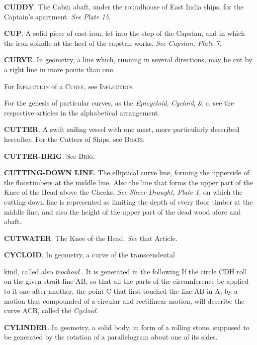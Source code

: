 \textbf{CUDDY}. The Cabin abaft, under the roundhouse of East India ships, for the Captain's apartment. \textit{See Plate 15}. 

\textbf{CUP}. A solid piece of cast-iron, let into the step of the Capstan, and in which the iron spindle at the heel of the capstan works. \textit{See Capstan, Plate 7}. 

\textbf{CURVE}. In geometry, a line which, running in several directions, may be cut by a right line in more points than one. 

For \textsc{Inflection} of a \textsc{Curve}, see \textsc{Inflection}. 

For the genesis of particular curves, as the \textit{Epicycloid}, \textit{Cycloid}, \& c. see the respective articles in the alphabetical arrangement. 

\textbf{CUTTER}. A swift sailing vessel with one mast, more particularly described hereafter. For the Cutters of Ships, see \textsc{Boats}. 

\textbf{CUTTER-BRIG}. See \textsc{Brig}. 

\textbf{CUTTING-DOWN LINE}. The elliptical curve line, forming the upperside of the floortimbers at the middle line. Also the line that forms the upper part of the Knee of the Head above the Cheeks. \textit{See Sheer Draught, Plate 1}, on which the cutting down line is represented as limiting the depth of every floor timber at the middle line, and also the height of the upper part of the dead wood afore and abaft. 

\textbf{CUTWATER}. The Knee of the Head. \textit{See} that Article. 

\textbf{CYCLOID}. In geometry, a curve of the transcendental
\begin{figure}
\begin{center}
\end{center}
\end{figure} 
kind, called also \textit{trochoid} . It is generated in the following If the circle CDH roll on the given strait line AB, so that all the parts of the circumference be applied to it one after another, the point C that first touched the line AB in A, by a motion thus compounded of a circular and rectilinear motion, will describe the curve ACB, called the \textit{Cycloid}. 

\textbf{CYLINDER}. In geometry, a solid body, in form of a rolling stone, supposed to be generated by the rotation of a parallelogram about one of its sides.

